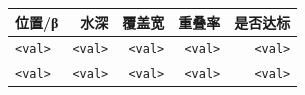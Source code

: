 \begin{tabular}{lrrrr}
\toprule
\textbf{位置/β} & \textbf{水深} & \textbf{覆盖宽} & \textbf{重叠率} & \textbf{是否达标} \\\midrule
\texttt{<val>} & \texttt{<val>} & \texttt{<val>} & \texttt{<val>} & \texttt{<val>} \\
\texttt{<val>} & \texttt{<val>} & \texttt{<val>} & \texttt{<val>} & \texttt{<val>} \\\bottomrule
\end{tabular}
